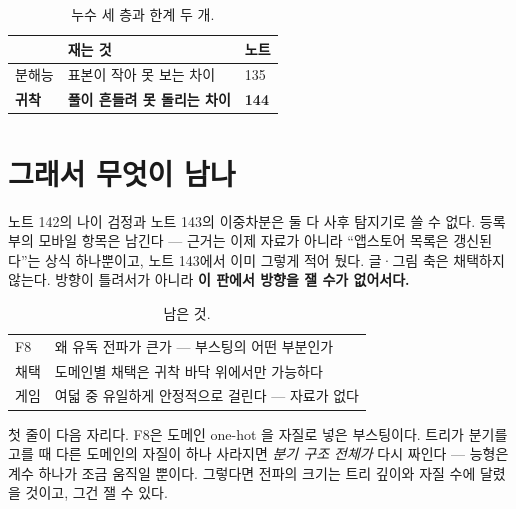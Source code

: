\documentclass[10pt]{article}
\begin{document}
\begin{table}[t]
\centering\tsize
\caption{누수 세 층과 한계 두 개.}
\begin{tabular}{lll}
\toprule
& 재는 것 & 노트 \\
\midrule
분해능 & 표본이 작아 못 보는 차이 & 135 \\
\textbf{귀착} & \textbf{풀이 흔들려 못 돌리는 차이} & \textbf{144} \\
\bottomrule
\end{tabular}
\end{table}

\section{그래서 무엇이 남나}

노트 142의 나이 검정과 노트 143의 이중차분은 둘 다 사후 탐지기로 쓸 수
없다. 등록부의 모바일 항목은 남긴다 --- 근거는 이제 자료가 아니라 ``앱스토어
목록은 갱신된다''는 상식 하나뿐이고, 노트 143에서 이미 그렇게 적어 뒀다.
글·그림 축은 채택하지 않는다. 방향이 틀려서가 아니라 \textbf{이 판에서
방향을 잴 수가 없어서다.}

\begin{table}[t]
\centering\tsize
\caption{남은 것.}
\begin{tabular}{ll}
\toprule
F8 & 왜 유독 전파가 큰가 --- 부스팅의 어떤 부분인가 \\
채택 & 도메인별 채택은 귀착 바닥 위에서만 가능하다 \\
게임 & 여덟 중 유일하게 안정적으로 걸린다 --- 자료가 없다 \\
\bottomrule
\end{tabular}
\end{table}

첫 줄이 다음 자리다. F8은 도메인 one-hot 을 자질로 넣은 부스팅이다. 트리가
분기를 고를 때 다른 도메인의 자질이 하나 사라지면 \emph{분기 구조 전체가}
다시 짜인다 --- 능형은 계수 하나가 조금 움직일 뿐이다. 그렇다면 전파의
크기는 트리 깊이와 자질 수에 달렸을 것이고, 그건 잴 수 있다.
\end{document}
